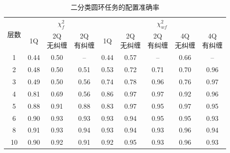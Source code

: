 \documentclass[a4paper]{ctexart}
\begin{document}
\begin{table}[H]
    \centering
    \caption{二分类圆环任务的配置准确率}
    \renewcommand{\arraystretch}{1.2}
    \begin{tabular}{@{}c*{8}{c}@{}}
        \toprule
        \multirow{2}{*}{层数} & \multicolumn{3}{c}{$\chi_f^2$} & \multicolumn{5}{c}{$\chi_{wf}^2$}                                           \\
        \cmidrule(lr){2-4}\cmidrule(lr){5-9}
                            & 1Q                             & \shortstack{2Q                                                              \\无纠缠} & \shortstack{2Q\\有纠缠} & 1Q & \shortstack{2Q\\无纠缠} & \shortstack{2Q\\有纠缠} & \shortstack{4Q\\无纠缠} & \shortstack{4Q\\有纠缠} \\
        \midrule
        1                   & 0.44                           & 0.50                              & --   & 0.44 & 0.57 & --   & 0.66 & --   \\
        2                   & 0.48                           & 0.50                              & 0.51 & 0.53 & 0.72 & 0.71 & 0.70 & 0.96 \\
        3                   & 0.49                           & 0.50                              & 0.56 & 0.74 & 0.78 & 0.96 & 0.76 & 0.97 \\
        4                   & 0.81                           & 0.69                              & 0.56 & 0.86 & 0.97 & 0.97 & 0.92 & 0.96 \\
        5                   & 0.88                           & 0.91                              & 0.88 & 0.83 & 0.97 & 0.95 & 0.97 & 0.95 \\
        6                   & 0.90                           & 0.93                              & 0.93 & 0.93 & 0.94 & 0.95 & 0.95 & 0.93 \\
        8                   & 0.91                           & 0.93                              & 0.94 & 0.93 & 0.94 & 0.93 & 0.96 & 0.94 \\
        10                  & 0.90                           & 0.92                              & 0.91 & 0.92 & 0.95 & 0.93 & 0.96 & 0.93 \\
        \bottomrule
    \end{tabular}
\end{table}
\end{document}
